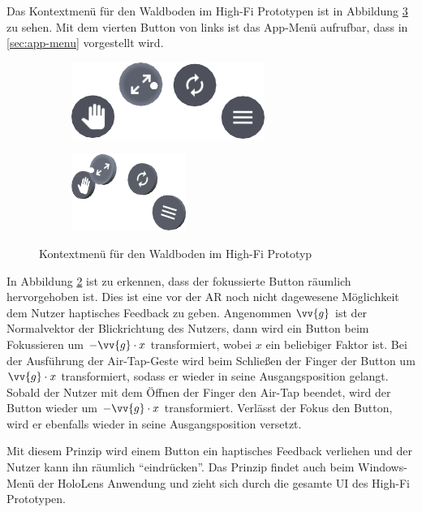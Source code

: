 Das Kontextmenü für den Waldboden im High-Fi Prototypen ist in Abbildung \ref{fig:context-menu} zu sehen. Mit dem vierten Button von links ist das App-Menü aufrufbar, dass in \ref{sec:app-menu} vorgestellt wird. 

\begin{figure}[htb]
  \centering
  \begin{subfigure}[b]{\fwidth}
    \centering
    \includegraphics[height=2.5cm]{figures/context-menu-front}
     \label{fig:context-menu-front}
  \end{subfigure}
  \begin{subfigure}[b]{\fwidth}
    \centering
  	\includegraphics[height=2.5cm]{figures/context-menu-side}
  	 \label{fig:context-menu-side}
  \end{subfigure}
  \caption{Kontextmenü für den Waldboden im High-Fi Prototyp} \label{fig:context-menu}
\end{figure}

In Abbildung \ref{fig:context-menu-side} ist zu erkennen, dass der fokussierte Button räumlich hervorgehoben ist. Dies ist eine vor der AR noch nicht dagewesene Möglichkeit dem Nutzer haptisches Feedback zu geben. Angenommen $\vv{g}$ ist der Normalvektor der Blickrichtung des Nutzers, dann wird ein Button beim Fokussieren um $-\vv{g} \cdot x$ transformiert, wobei $x$ ein beliebiger Faktor ist. Bei der Ausführung der Air-Tap-Geste wird beim Schließen der Finger der Button um $\vv{g} \cdot x$ transformiert, sodass er wieder in seine Ausgangsposition gelangt. Sobald der Nutzer mit dem Öffnen der Finger den Air-Tap beendet, wird der Button wieder um $-\vv{g} \cdot x$ transformiert. Verlässt der Fokus den Button, wird er ebenfalls wieder in seine Ausgangsposition versetzt.

Mit diesem Prinzip wird einem Button ein haptisches Feedback verliehen und der Nutzer kann ihn räumlich "`eindrücken"'. Das Prinzip findet auch beim Windows-Menü der HoloLens Anwendung und zieht sich durch die gesamte UI des High-Fi Prototypen.

